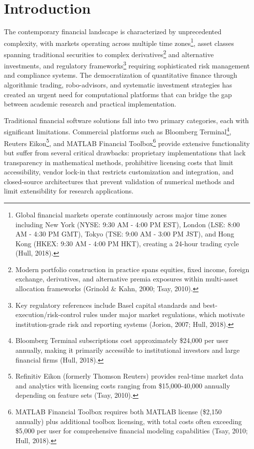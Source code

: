 \documentclass[12pt,a4paper]{article}
\theoremstyle{definition}
\theoremstyle{remark}
\begin{document}
\clearpage
{}
\setcounter{page}{1}

\section{Introduction}

The contemporary financial landscape is characterized by unprecedented complexity, with markets operating across multiple time zones\footnote{Global financial markets operate continuously across major time zones including New York (NYSE: 9:30 AM - 4:00 PM EST), London (LSE: 8:00 AM - 4:30 PM GMT), Tokyo (TSE: 9:00 AM - 3:00 PM JST), and Hong Kong (HKEX: 9:30 AM - 4:00 PM HKT), creating a 24-hour trading cycle (Hull, 2018).}, asset classes spanning traditional securities to complex derivatives\footnote{Modern portfolio construction in practice spans equities, fixed income, foreign exchange, derivatives, and alternative premia exposures within multi-asset allocation frameworks (Grinold \& Kahn, 2000; Tsay, 2010).} and alternative investments, and regulatory frameworks\footnote{Key regulatory references include Basel capital standards and best-execution/risk-control rules under major market regulations, which motivate institution-grade risk and reporting systems (Jorion, 2007; Hull, 2018).} requiring sophisticated risk management and compliance systems. The democratization of quantitative finance through algorithmic trading, robo-advisors, and systematic investment strategies has created an urgent need for computational platforms that can bridge the gap between academic research and practical implementation.

Traditional financial software solutions fall into two primary categories, each with significant limitations. Commercial platforms such as Bloomberg Terminal\footnote{Bloomberg Terminal subscriptions cost approximately \$24,000 per user annually, making it primarily accessible to institutional investors and large financial firms (Hull, 2018).}, Reuters Eikon\footnote{Refinitiv Eikon (formerly Thomson Reuters) provides real-time market data and analytics with licensing costs ranging from \$15,000-40,000 annually depending on feature sets (Tsay, 2010).}, and MATLAB Financial Toolbox\footnote{MATLAB Financial Toolbox requires both MATLAB license (\$2,150 annually) plus additional toolbox licensing, with total costs often exceeding \$5,000 per user for comprehensive financial modeling capabilities (Tsay, 2010; Hull, 2018).} provide extensive functionality but suffer from several critical drawbacks: proprietary implementations that lack transparency in mathematical methods, prohibitive licensing costs that limit accessibility, vendor lock-in that restricts customization and integration, and closed-source architectures that prevent validation of numerical methods and limit extensibility for research applications.
\end{document}
